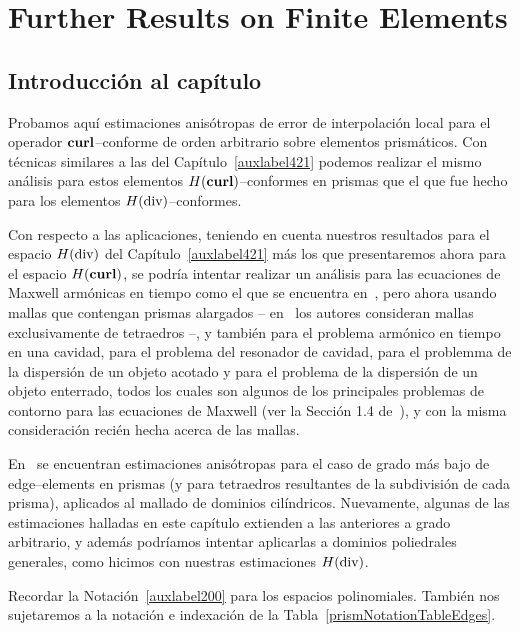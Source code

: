 \chapter{Further Results on Finite Elements}
\label{auxlabel202}
\section*{Introducci\'on al cap\'itulo}

Probamos aqu\'i estimaciones anis\'otropas de error de interpolaci\'on local
para el operador $\textbf{curl}$--conforme de orden arbitrario sobre elementos
prism\'aticos. 
Con t\'ecnicas similares a las del Cap\'itulo~\ref{auxlabel421}
podemos realizar el mismo 
an\'alisis para estos elementos $H(\textbf{curl})$--conformes en prismas
que el que fue hecho para los elementos $H(\operatorname{\textrm{div}})$--conformes.

Con respecto a las aplicaciones, 
teniendo en cuenta nuestros resultados para el espacio $H(\operatorname{\textrm{div}})$ 
del Cap\'itulo~\ref{auxlabel421} m\'as los que presentaremos
ahora para el espacio $H(\textbf{curl})$, se podr\'ia intentar realizar
un an\'alisis para las ecuaciones de Maxwell arm\'onicas en tiempo
como el que se encuentra en~\cite{buffaCostabelDauge}, pero
ahora usando mallas que contengan prismas alargados 
-- en~\cite{buffaCostabelDauge} los autores consideran
mallas exclusivamente de tetraedros --, y tambi\'en 
para el problema arm\'onico en tiempo en una cavidad,
para el problema del resonador de cavidad, para el problemma
de la dispersi\'on de un objeto acotado y para el problema
de la dispersi\'on de un objeto enterrado, todos los cuales
son algunos de los principales problemas de contorno
para las ecuaciones de Maxwell
(ver la Secci\'on 1.4 de~\cite{monk}), 
y con la misma consideraci\'on
reci\'en hecha acerca de las mallas.

En~\cite{MR1860445} se encuentran estimaciones anis\'otropas
para el caso de grado m\'as bajo de edge--elements en prismas
(y para tetraedros resultantes de la subdivisi\'on de cada prisma),
aplicados al mallado de dominios cil\'indricos.
Nuevamente, algunas de las estimaciones halladas 
en este cap\'itulo extienden a las anteriores a grado arbitrario,
y adem\'as podr\'iamos intentar aplicarlas a dominios poliedrales 
generales, como hicimos con nuestras estimaciones $H(\operatorname{\textrm{div}})$.

Recordar la Notaci\'on~\ref{auxlabel200} para los espacios polinomiales. 
Tambi\'en nos sujetaremos a la notaci\'on e indexaci\'on de la  
Tabla~\ref{prismNotationTableEdges}.

